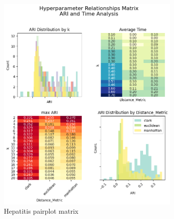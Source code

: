 \begin{figure}[H]
    \centering
    \begin{subfigure}{0.49\textwidth}
        \centering
        \includegraphics[width=\linewidth]{figures/KMeans/hepatitis_hyperparameter_pairplot_matrix.png}
        \caption{Hepatitis pairplot matrix}
    \end{subfigure}
    \hfill
    \begin{subfigure}{0.49\textwidth}
        \centering

\end{subfigure}
\end{figure}
